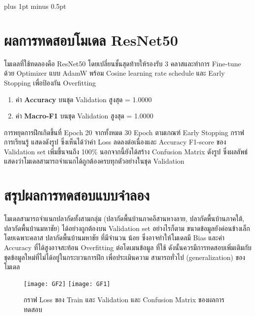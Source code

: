 
\clearpage
\thispagestyle{plain}

\begingroup
\fontsize{16pt}{19.2pt}\selectfont
\justifying
\XeTeXlinebreakskip=0pt plus 1pt minus 0.5pt
\setlength{\parindent}{1.5cm}
\setlength{\parskip}{0pt}

\section*{ผลการทดสอบโมเดล ResNet50}

\indent โมเดลที่ใช้ทดลองคือ ResNet50 โดยเปลี่ยนชั้นสุดท้ายให้รองรับ 3 คลาสและทำการ
Fine-tune ด้วย Optimizer แบบ AdamW พร้อม Cosine learning rate schedule และ Early
Stopping เพื่อป้องกัน Overfitting

\begin{sloppypar}
	\begin{enumerate}
		\item ค่า \textbf{Accuracy} บนชุด Validation สูงสุด = 1.0000
		\item ค่า \textbf{Macro-F1} บนชุด Validation สูงสุด = 1.0000
	\end{enumerate}
\end{sloppypar}

\indent การหยุดการฝึกเกิดขึ้นที่ Epoch 20 จากทั้งหมด 30 Epoch ตามเกณฑ์ Early Stopping กราฟการเรียนรู้ แสดงดังรูป ซึ่งเห็นได้ว่าค่า Loss ลดลงต่อเนื่องและ Accuracy
F1-score ของ Validation set เพิ่มขึ้นจนถึง 100\% นอกจากนี้ยังได้สร้าง Confusion Matrix ดังรูป ซึ่งผลลัพธ์แสดงว่าโมเดลสามารถจำแนกได้ถูกต้องครบทุกตัวอย่างในชุด Validation

\vspace{\baselineskip}

\section*{สรุปผลการทดสอบแบบจำลอง}
\indent โมเดลสามารถจำแนกปลากัดทั้งสามกลุ่ม (ปลากัดพื้นบ้านภาคอีสานหางลาย, ปลากัดพื้นบ้านภาคใต้, ปลากัดพื้นบ้านมหาชัย) ได้อย่างถูกต้องบน
Validation set อย่างไรก็ตาม ขนาดข้อมูลยังค่อนข้างเล็กโดยเฉพาะคลาส ปลากัดพื้นบ้านมหาชัย ที่มีจำนวน
น้อย ซึ่งอาจทำให้โมเดลมี Bias และค่า Accuracy ที่ได้สูงอาจสะท้อน Overfitting ต่อโดเมนข้อมูล
ที่ใช้ ดังนั้นควรมีการทดสอบเพิ่มเติมกับชุดข้อมูลใหม่ที่ไม่ได้อยู่ในกระบวนการฝึก เพื่อประเมินความ
สามารถทั่วไป (generalization) ของโมเดล

\vspace{\baselineskip}

\begin{figure}[h]
	\centering
	\texttt{[image: GF2]}
	\hfill
	\texttt{[image: GF1]}
	\caption{กราฟ Loss ของ Train และ Validation และ Confusion Matrix ของผลการทดสอบ}
\end{figure}

\endgroup


